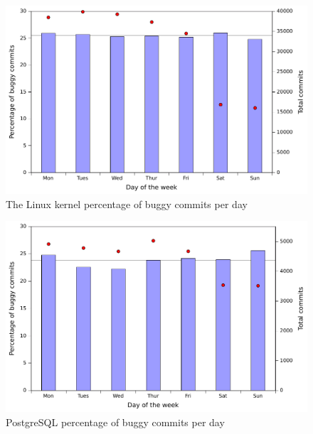 \begin{figure}
\begin{center}
\includegraphics[width=\columnwidth]{linux-bugginess-day.pdf}
\end{center}
\caption{The Linux kernel percentage of buggy commits per day}
\label{fig-linux-bugginess-day}
\end{figure}

\begin{figure}
\begin{center}
\includegraphics[width=\columnwidth]{postgresql-bugginess-day.pdf}
\end{center}
\caption{PostgreSQL percentage of buggy commits per day}
\label{fig-postgresql-bugginess-day}
\end{figure}

